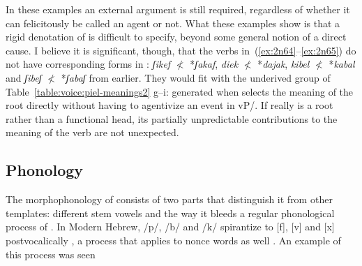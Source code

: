 \begin{exe}
\begin{xlist}
\begin{exe}
\begin{xlist}
\begin{exe}
\begin{xlist}
\begin{exe}
\begin{exe}
\begin{xlist}
\begin{exe}
\begin{xlist}
\begin{exe}
\begin{xlist}
\begin{exe}
\begin{xlist}
\begin{exe}
\begin{xlist}
\begin{exe}
\begin{xlist}
\begin{exe}
\begin{xlist}
\begin{exe}
\begin{xlist}
\begin{xlist}
\begin{exe}
\begin{xlist}
\begin{exe}
\begin{xlist}
\begin{exe}
\begin{xlist}
\begin{exe}
\begin{xlist}
\begin{exe}
\begin{xlist}
\begin{exe}
\begin{xlist}
\begin{exe}
\begin{xlist}
\begin{exe}
\begin{xlist}
\begin{exe}
\begin{xlist}
\begin{exe}
\begin{xlist}
\begin{exe}
\begin{xlist}
\begin{exe}
\begin{xlist}
\begin{xlist}
\begin{xlist}
\begin{exe}
\begin{xlist}
\begin{xlist}
\begin{xlist}
\begin{exe}
\begin{exe}
\begin{xlist}
\begin{exe}
\begin{xlist}
\begin{exe}
\begin{xlist}
\begin{exe}
\begin{xlist}
\begin{exe}
\begin{xlist}
\begin{exe}
\begin{xlist}
\begin{exe}
\begin{xlist}
\begin{exe}
\begin{exe}
\begin{xlist}
\begin{xlist}
\begin{exe}
\begin{xlist}
\begin{exe}
\begin{xlist}
\begin{exe}
\begin{xlist}
\begin{exe}
\begin{xlist}
\begin{exe}
\begin{xlist}
\begin{exe}
\begin{xlist}
\begin{exe}
\begin{exe}
\begin{exe}
\begin{xlist}
\begin{exe}
\begin{xlist}
\begin{exe}
\begin{xlist}
\begin{exe}
\begin{xlist}
\begin{exe}
\begin{xlist}
\begin{exe}
\begin{xlist}
 \z
{} \label{ex:2n65}
  
 \z 

In these examples an external argument is still required, regardless of whether it can felicitously be called an agent or not. What these examples show is that a rigid denotation of {\va} is difficult to specify, beyond some general notion of a direct cause. I believe it is significant, though, that the verbs in~(\ref{ex:2n64}--\ref{ex:2n65}) do not have corresponding forms in {\tkal}: \emph{ʃikef} $\nless$ *\emph{ʃakaf}, \emph{diek} $\nless$ *\emph{dajak}, \emph{kibel} $\nless$ *\emph{kabal} and \emph{ʃibeʃ} $\nless$ *\emph{ʃabaʃ} from earlier. They would fit with the underived group of Table~\ref{table:voice:piel-meanings2} g--i: generated when {\va} selects the meaning of the root directly without having to agentivize an event in vP/{\tkal}. If {\va} really is a root rather than a functional head, its partially unpredictable contributions to the meaning of the verb are not unexpected.

	\subsection{Phonology} \label{voice:va:phono}
The morphophonology of {\tpie} consists of two parts that distinguish it from other templates: different stem vowels and the way it bleeds a regular phonological process of . In Modern Hebrew, /p/, /b/ and /k/ spirantize to [f], [v] and [x] postvocalically \citep{adam02,temkinmartinez08wccfl,gouskova12nllt}, a process that applies to nonce words as well \citep{temkinmartinzemuellner16}. An example of this process was seen 
\end{xlist}
\end{exe}
\end{xlist}
\end{exe}
\end{xlist}
\end{exe}
\end{xlist}
\end{exe}
\end{xlist}
\end{exe}
\end{xlist}
\end{exe}
\end{exe}
\end{exe}
\end{xlist}
\end{exe}
\end{xlist}
\end{exe}
\end{xlist}
\end{exe}
\end{xlist}
\end{exe}
\end{xlist}
\end{exe}
\end{xlist}
\end{exe}
\end{xlist}
\end{xlist}
\end{exe}
\end{exe}
\end{xlist}
\end{exe}
\end{xlist}
\end{exe}
\end{xlist}
\end{exe}
\end{xlist}
\end{exe}
\end{xlist}
\end{exe}
\end{xlist}
\end{exe}
\end{xlist}
\end{exe}
\end{exe}
\end{xlist}
\end{xlist}
\end{xlist}
\end{exe}
\end{xlist}
\end{xlist}
\end{xlist}
\end{exe}
\end{xlist}
\end{exe}
\end{xlist}
\end{exe}
\end{xlist}
\end{exe}
\end{xlist}
\end{exe}
\end{xlist}
\end{exe}
\end{xlist}
\end{exe}
\end{xlist}
\end{exe}
\end{xlist}
\end{exe}
\end{xlist}
\end{exe}
\end{xlist}
\end{exe}
\end{xlist}
\end{exe}
\end{xlist}
\end{xlist}
\end{exe}
\end{xlist}
\end{exe}
\end{xlist}
\end{exe}
\end{xlist}
\end{exe}
\end{xlist}
\end{exe}
\end{xlist}
\end{exe}
\end{xlist}
\end{exe}
\end{xlist}
\end{exe}
\end{exe}
\end{xlist}
\end{exe}
\end{xlist}
\end{exe}
\end{xlist}
\end{exe}
